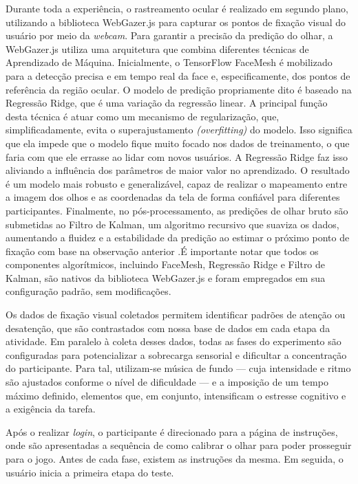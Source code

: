 Durante toda a experiência, o rastreamento ocular é realizado em segundo plano, utilizando a biblioteca WebGazer.js para capturar os pontos de fixação visual do usuário por meio da \textit{webcam}. Para garantir a precisão da predição do olhar, a WebGazer.js utiliza uma arquitetura que combina diferentes técnicas de Aprendizado de Máquina. Inicialmente, o TensorFlow FaceMesh é mobilizado para a detecção precisa e em tempo real da face e, especificamente, dos pontos de referência da região ocular. O modelo de predição propriamente dito é baseado na Regressão Ridge, que é uma variação da regressão linear. A principal função desta técnica é atuar como um mecanismo de regularização, que, simplificadamente, evita o superajustamento \textit{(overfitting)} do modelo. Isso significa que ela impede que o modelo fique muito focado nos dados de treinamento, o que faria com que ele errasse ao lidar com novos usuários. A Regressão Ridge faz isso aliviando a influência dos parâmetros de maior valor no aprendizado. O resultado é um modelo mais robusto e generalizável, capaz de realizar o mapeamento entre a imagem dos olhos e as coordenadas da tela de forma confiável para diferentes participantes. Finalmente, no pós-processamento, as predições de olhar bruto são submetidas ao Filtro de Kalman, um algoritmo recursivo que suaviza os dados, aumentando a fluidez e a estabilidade da predição ao estimar o próximo ponto de fixação com base na observação anterior \cite{WebGazerDoc}.É importante notar que todos os componentes algorítmicos, incluindo FaceMesh, Regressão Ridge e Filtro de Kalman, são nativos da biblioteca WebGazer.js e foram empregados em sua configuração padrão, sem modificações.

Os dados de fixação visual coletados permitem identificar padrões de atenção ou desatenção, que são contrastados com nossa base de dados em cada etapa da atividade. Em paralelo à coleta desses dados, todas as fases do experimento são configuradas para potencializar a sobrecarga sensorial e dificultar a concentração do participante. Para tal, utilizam-se música de fundo — cuja intensidade e ritmo são ajustados conforme o nível de dificuldade — e a imposição de um tempo máximo definido, elementos que, em conjunto, intensificam o estresse cognitivo e a exigência da tarefa.

Após o realizar \textit{login}, o participante é direcionado para a página de instruções, onde são apresentadas a sequência de como calibrar o olhar para poder prosseguir para o jogo. Antes de cada fase, existem as instruções da mesma. Em seguida, o usuário inicia a primeira etapa do teste. 

